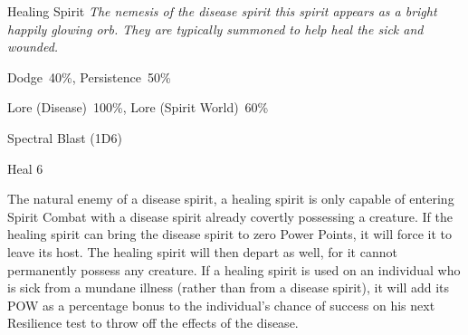 \begin{monsterbox}{Healing Spirit}
	\textit{The nemesis of the disease spirit this spirit appears as a bright happily glowing orb. They are typically summoned to help heal the sick and wounded.}\\
	\rpghline
	\basics[%
	powerpoints = 14,
	movementrate = 30m,
	plunderrating = 0
	]
	\rpghline%
	\stats[ %
		STR = -,
		CON = -,
		DEX = -,
		SIZ = -,
		INT = 2D6    (7),
		POW = 4D6    (14),
		CHA = 3D6    (11)
	]
	\rpghline%
	\begin{rpg-monsteraction}[Resistances]
		Dodge~40\%, Persistence~50\%
	\end{rpg-monsteraction}
	\begin{rpg-monsteraction}[Knowledge]
		Lore (Disease)~100\%, Lore (Spirit World)~60\%
	\end{rpg-monsteraction}
	\begin{rpg-monsteraction}
		Spectral Blast (1D6)
	\end{rpg-monsteraction}
	\begin{rpg-monsteraction}[Magic 100\%]
		Heal 6
	\end{rpg-monsteraction}
	\begin{rpg-monsteraction}
		The natural enemy of a disease spirit, a healing spirit is only capable of entering Spirit Combat with a disease spirit already covertly possessing a creature. If the healing spirit can bring the disease spirit to zero Power Points, it will force it to leave its host. The healing spirit will then depart as well, for it cannot permanently possess any creature. If a healing spirit is used on an individual who is sick from a mundane illness (rather than from a disease spirit), it will add its POW as a percentage bonus to the individual’s chance of success on his next Resilience test to throw off the effects of the disease.
	\end{rpg-monsteraction}
\end{monsterbox}

\newpage 

